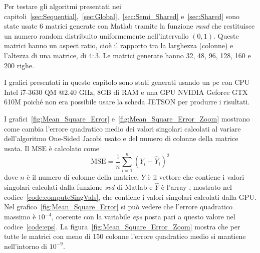 \label{sec:Performance}
Per testare gli algoritmi presentati nei capitoli~\ref{sec:Sequential},~\ref{sec:Global},~\ref{sec:Semi_Shared} e~\ref{sec:Shared} sono state usate 6 matrici generate con Matlab tramite la funzione \textit{rand} che restituisce un numero random distribuito uniformemente nell'intervallo $(0,1)$. Queste matrici hanno un aspect ratio, cioè il rapporto tra la larghezza (colonne) e l'altezza di una matrice, di $4:3$. Le matrici generate hanno 32, 48, 96, 128, 160 e 200 righe. 

I grafici presentati in questo capitolo sono stati generati usando un pc con CPU Intel i7-3630 QM @2.40 GHz, 8GB di RAM e una GPU NVIDIA Geforce GTX 610M poiché non era possibile usare la scheda JETSON per produrre i risultati.

I grafici~\ref{fig:Mean_Square_Error} e~\ref{fig:Mean_Square_Error_Zoom} mostrano come cambia l'errore quadratico medio dei valori singolari calcolati al variare dell'algoritmo One-Sided Jacobi usato e del numero di colonne della matrice usata. Il MSE è calcolato come 
$$ \text{MSE} = \dfrac{1}{n} \sum_{i = 1}^{n} (Y_i - \hat{Y}_i)^2$$
dove $n$ è il numero di colonne della matrice, $Y$ è il vettore che contiene i valori singolari calcolati dalla funzione \textit{svd} di Matlab e $\hat{Y}$ è l'array , mostrato nel codice~\ref{code:computeSingVals}, che contiene i valori singolari calcolati dalla GPU. Nel grafico~\ref{fig:Mean_Square_Error} si può vedere che l'errore quadratico massimo è $10^{-4}$, coerente con la variabile \textit{eps} posta pari a questo valore nel codice~\ref{code:eps}. La figura~\ref{fig:Mean_Square_Error_Zoom} mostra che per tutte le matrici con meno di 150 colonne l'errore quadratico medio si mantiene nell'intorno di $10^{-9}$.
